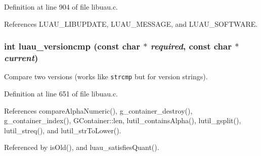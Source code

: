 Definition at line 904 of file libuau.c.

References LUAU\_\-LIBUPDATE, LUAU\_\-MESSAGE, and LUAU\_\-SOFTWARE.
\subsubsection{\setlength{\rightskip}{0pt plus 5cm}int luau\_\-versioncmp (const char $\ast$ {\em required}, const char $\ast$ {\em current})}\label{libuau_8h_a77}


Compare two versions (works like {\tt strcmp} but for version strings). 



Definition at line 651 of file libuau.c.

References compare\-Alpha\-Numeric(), g\_\-container\_\-destroy(), g\_\-container\_\-index(), GContainer::len, lutil\_\-contains\-Alpha(), lutil\_\-gsplit(), lutil\_\-streq(), and lutil\_\-str\-To\-Lower().

Referenced by is\-Old(), and luau\_\-satisfies\-Quant().
